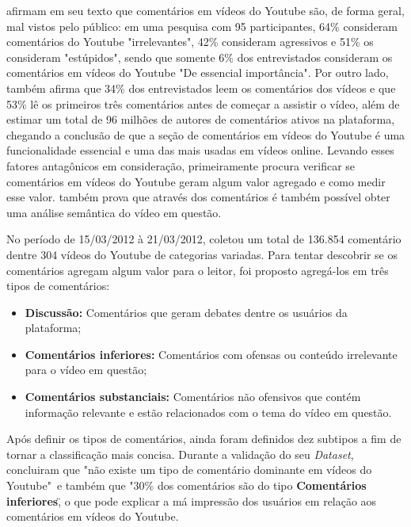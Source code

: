  afirmam em seu texto que comentários em vídeos do Youtube são, de forma geral, mal vistos pelo público: em uma pesquisa com 95 participantes, 64\% consideram comentários do Youtube "irrelevantes", 42\% consideram agressivos e 51\% os consideram "estúpidos", sendo que somente 6\% dos entrevistados consideram os comentários em vídeos do Youtube "De essencial importância". Por outro lado,  também afirma que 34\% dos entrevistados leem os comentários dos vídeos e que 53\% lê os primeiros três comentários antes de começar a assistir o vídeo, além de estimar um total de 96 milhões de autores de comentários ativos na plataforma, chegando a conclusão de que a seção de comentários em vídeos do Youtube é uma funcionalidade essencial e uma das mais usadas em vídeos online. Levando esses fatores antagônicos em consideração, \cite{schultes2013leave} primeiramente procura verificar se comentários em vídeos do Youtube geram algum valor agregado e como medir esse valor. \cite{schultes2013leave} também prova que através dos comentários é também possível obter uma análise semântica do vídeo em questão. 

No período de 15/03/2012 à 21/03/2012, \cite{schultes2013leave} coletou um total de 136.854 comentário dentre 304 vídeos do Youtube de categorias variadas. Para tentar descobrir se os comentários agregam algum valor para o leitor, foi proposto agregá-los em três tipos de comentários:
\begin{itemize}
    \item \textbf{Discussão:} Comentários que geram debates dentre os usuários da plataforma;
    \item \textbf{Comentários inferiores:} Comentários com ofensas ou conteúdo irrelevante para o vídeo em questão; 
   \item \textbf{Comentários substanciais:} Comentários não ofensivos que contém informação relevante e estão relacionados com o tema do vídeo em questão.
\end{itemize}
Após definir os tipos de comentários, ainda foram definidos dez subtipos a fim de tornar a classificação mais concisa. %
Durante a validação do seu \textit{Dataset},  concluiram que "não existe um tipo de comentário dominante em vídeos do Youtube"\ e também que "30\% dos comentários são do tipo \textbf{Comentários inferiores}\", o que pode explicar a má impressão dos usuários em relação aos comentários em vídeos do Youtube.

